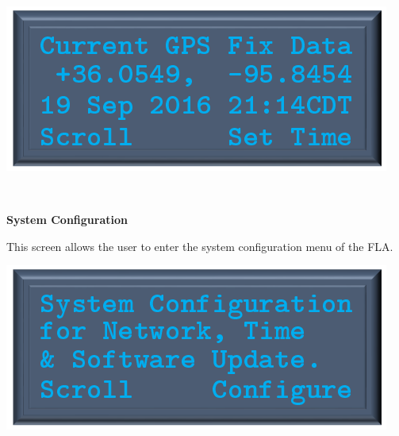 \documentclass[11pt, oneside]{book}
\begin{document}
\hfill%
\begin{minipage}{0.45\textwidth} 
	\includegraphics[width=\linewidth]{../media/pstricks_files/05_gps_screen} 
\end{minipage}\\[\baselineskip]
\noindent\begin{minipage}{0.45\textwidth}%
	\begin{center}
		\textbf{System Configuration}
	\end{center}
	This screen allows the user to enter the system configuration menu of the FLA.
\end{minipage}%
\hfill%
\begin{minipage}{0.45\textwidth} 
	\includegraphics[width=\linewidth]{../media/pstricks_files/06_system_configuration}
\end{minipage}\\[\baselineskip]
\end{document}
